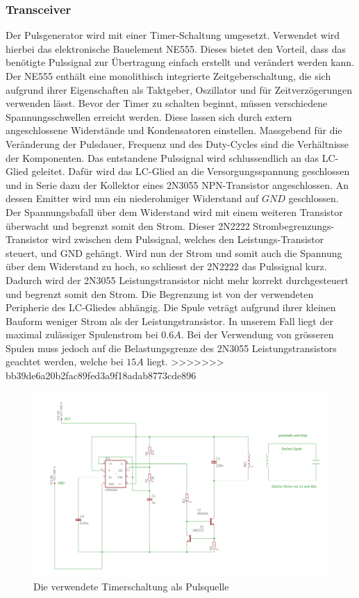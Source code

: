 \subsubsection*{Transceiver}
Der Pulsgenerator wird mit einer Timer-Schaltung umgesetzt. Verwendet wird hierbei das elektronische Bauelement NE555. Dieses bietet den Vorteil, dass das benötigte Pulssignal zur Übertragung einfach erstellt und verändert werden kann. Der NE555 enthält eine monolithisch integrierte Zeitgeberschaltung, die sich aufgrund ihrer Eigenschaften als Taktgeber, Oszillator und für Zeitverzögerungen verwenden lässt. Bevor der Timer zu schalten beginnt, müssen verschiedene Spannungsschwellen erreicht werden. Diese lassen sich durch extern angeschlossene Widerstände und Kondensatoren einstellen. Massgebend für die Veränderung der Pulsdauer, Frequenz und des Duty-Cycles sind die Verhältnisse der Komponenten. Das entstandene Pulssignal wird schlussendlich an das LC-Glied geleitet. Dafür wird das LC-Glied an die Versorgungsspannung geschlossen und in Serie dazu der Kollektor eines 2N3055 NPN-Transistor angeschlossen. An dessen Emitter wird nun ein niederohmiger Widerstand auf $GND$ geschlossen. Der Spannungsbafall über dem Widerstand wird mit einem weiteren Transistor überwacht und begrenzt somit den Strom. Dieser {\glqq 2N2222 Strombegrenzungs-Transistor\grqq} wird zwischen dem Pulssignal, welches den Leistungs-Transistor steuert, und GND gehängt. Wird nun der Strom und somit auch die Spannung über dem Widerstand zu hoch, so schliesst der {\glqq 2N2222\grqq} das Pulssignal kurz. Dadurch wird der 2N3055 Leistungstransistor nicht mehr korrekt durchgesteuert und begrenzt somit den Strom. Die Begrenzung ist von der verwendeten Peripherie des LC-Gliedes abhängig. Die Spule veträgt aufgrund ihrer kleinen Bauform weniger Strom als der Leistungstransistor. In unserem Fall liegt der maximal zulässiger Spulenstrom bei $0.6A$. Bei der Verwendung von grösseren Spulen muss jedoch auf die Belastungsgrenze des 2N3055 Leistungstransistors geachtet werden, welche bei $15A$ liegt.
>>>>>>> bb39de6a20b2fac89fed3a9f18adab8773cde896

\begin{figure}[H]
	\begin{center}
		\includegraphics[width=\textwidth]{data/Tranceiver.png}
		\caption[Ne555]{Die verwendete Timerschaltung als Pulsquelle} %
		\label{fig:Tranceiver-Schaltung}
	\end{center}
\end{figure}
 
